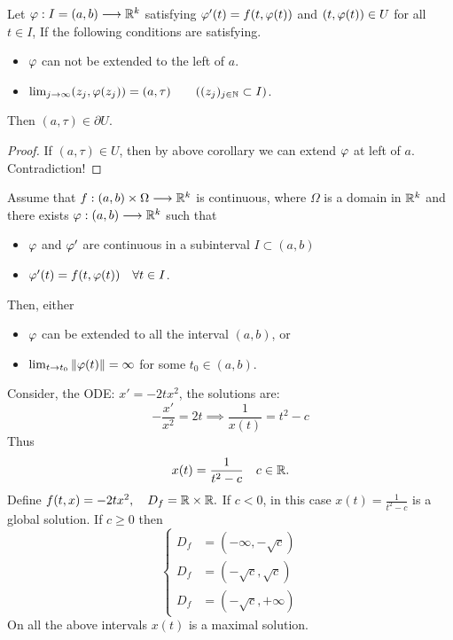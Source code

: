 \begin{theorem}[]
  Let $ \varphi : I = (a, b)  \longrightarrow \mathbb{R} ^k  $ satisfying $\varphi'(t) = f(t, \varphi(t) )  $ and 
  $(t, \varphi(t) ) \in   U$ for all $t \in   I$, If the following conditions are satisfying.
  \begin{itemize}
    \item [\ding{172} ] $\varphi$ can not be extended to the left of $a$.
    \item [\ding{173} ] $\lim_{j \to \infty} (z_j, \varphi(z_{j}) ) = (a, \tau ) \quad \quad ((z_{j})_{j \in  \mathbb{N}}\subset I ) $.
  \end{itemize}
  Then $(a, \tau ) \in  \partial U.$ 
\end{theorem}
\begin{proof}
If $(a, \tau ) \in  U$, then by above corollary we can extend $\varphi$ at left of $a$. Contradiction!
\end{proof}
\begin{corollary}[]
Assume that $ f : (a, b) \times \Omega  \longrightarrow \mathbb{R} ^k  $ is continuous, where 
$\Omega$ is a domain in $\mathbb{R} ^k $ and there exists $ \varphi : (a, b)  \longrightarrow \mathbb{R} ^k  $  such that
\begin{itemize}
  \item [\ding{172} ]
$\varphi$ and $\varphi'$ are continuous in a subinterval $I \subset (a, b) $
\item [\ding{173} ]  $\varphi'(t)  = f(t, \varphi(t) ) \quad \forall  t \in  I$.
\end{itemize}
Then, either 
\begin{itemize}
  \item [\ding{172} ] 
    $\varphi$ can be extended to all the interval $(a, b) $, or
  \item [\ding{173} ]  $\lim_{t \to t_0} \| \varphi(t)  \| = \infty $ for some $t_0 \in  (a, b) $.
\end{itemize}
\end{corollary}
\begin{example}
Consider, the ODE: $x' = -2t x^2 $, the solutions are:
\[
  - \frac{x'}{x^2 }= 2 t \implies  \frac{1}{x(t)} = t^2  - c
\]
Thus 
\[
x(t)  = \frac{1}{t^2  - c}\quad c \in  \mathbb{R}.
\]
Define $f(t, x) = - 2 t x^2, \quad D_{f} = \mathbb{R} \times \mathbb{R} . $ If $c <  0$, in this case
$x(t) =  \frac{1}{t^2  - c}$ is a global solution. If $c \geq 0$  then 
\[
  \begin{cases}
    D_{f} &= (- \infty , - \sqrt{c}  )  \\
    D_{f} &= (- \sqrt{c}   ,  \sqrt{c}  )  \\
    D_{f} &= (- \sqrt{c}   , +\infty   )  
  \end{cases}
\]
On all the above intervals $x(t) $ is a maximal solution.
\end{example}

